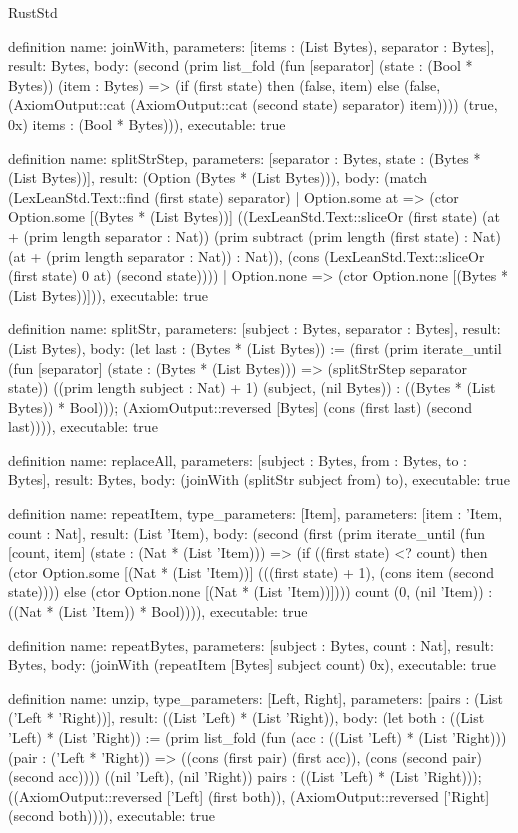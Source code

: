 \begin{lexlean}{RustStd}
\begin{semanticmodule}
definition{
  name: joinWith,
  parameters: [items : (List Bytes), separator : Bytes],
  result: Bytes,
  body: (second (prim list_fold (fun [separator] (state : (Bool * Bytes)) (item : Bytes) => (if (first state) then (false, item) else (false, (AxiomOutput::cat (AxiomOutput::cat (second state) separator) item)))) (true, 0x) items : (Bool * Bytes))),
  executable: true
}

definition{
  name: splitStrStep,
  parameters: [separator : Bytes, state : (Bytes * (List Bytes))],
  result: (Option (Bytes * (List Bytes))),
  body: (match (LexLeanStd.Text::find (first state) separator)
    | Option.some at => (ctor Option.some [(Bytes * (List Bytes))] ((LexLeanStd.Text::sliceOr (first state) (at + (prim length separator : Nat)) (prim subtract (prim length (first state) : Nat) (at + (prim length separator : Nat)) : Nat)), (cons (LexLeanStd.Text::sliceOr (first state) 0 at) (second state))))
    | Option.none => (ctor Option.none [(Bytes * (List Bytes))])),
  executable: true
}

definition{
  name: splitStr,
  parameters: [subject : Bytes, separator : Bytes],
  result: (List Bytes),
  body: (let last : (Bytes * (List Bytes)) := (first (prim iterate_until (fun [separator] (state : (Bytes * (List Bytes))) => (splitStrStep separator state)) ((prim length subject : Nat) + 1) (subject, (nil Bytes)) : ((Bytes * (List Bytes)) * Bool))); (AxiomOutput::reversed [Bytes] (cons (first last) (second last)))),
  executable: true
}

definition{
  name: replaceAll,
  parameters: [subject : Bytes, from : Bytes, to : Bytes],
  result: Bytes,
  body: (joinWith (splitStr subject from) to),
  executable: true
}

definition{
  name: repeatItem,
  type_parameters: [Item],
  parameters: [item : 'Item, count : Nat],
  result: (List 'Item),
  body: (second (first (prim iterate_until (fun [count, item] (state : (Nat * (List 'Item))) => (if ((first state) <? count) then (ctor Option.some [(Nat * (List 'Item))] (((first state) + 1), (cons item (second state)))) else (ctor Option.none [(Nat * (List 'Item))]))) count (0, (nil 'Item)) : ((Nat * (List 'Item)) * Bool)))),
  executable: true
}

definition{
  name: repeatBytes,
  parameters: [subject : Bytes, count : Nat],
  result: Bytes,
  body: (joinWith (repeatItem [Bytes] subject count) 0x),
  executable: true
}

definition{
  name: unzip,
  type_parameters: [Left, Right],
  parameters: [pairs : (List ('Left * 'Right))],
  result: ((List 'Left) * (List 'Right)),
  body: (let both : ((List 'Left) * (List 'Right)) := (prim list_fold (fun (acc : ((List 'Left) * (List 'Right))) (pair : ('Left * 'Right)) => ((cons (first pair) (first acc)), (cons (second pair) (second acc)))) ((nil 'Left), (nil 'Right)) pairs : ((List 'Left) * (List 'Right))); ((AxiomOutput::reversed ['Left] (first both)), (AxiomOutput::reversed ['Right] (second both)))),
  executable: true
}


\end{semanticmodule}
\end{lexlean}
